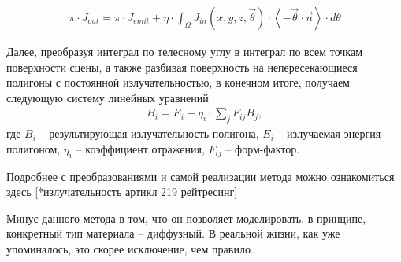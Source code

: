 \begin{gather}  
  \pi \cdot J_{out} = \pi \cdot J_{emit} + \eta \cdot \int_\Omega J_{in}(x,y,z,\vec \theta) \cdot \left\langle  {-\vec \theta \cdot \vec n} \right\rangle \cdot d\theta
\end{gather}

Далее, преобразуя интеграл по телесному углу в интеграл по всем точкам поверхности сцены, а также разбивая поверхность на непересекающиеся полигоны с постоянной излучательностью, в конечном итоге, получаем следующую систему линейных уравнений
\begin{gather}  
  B_i = E_i + \eta_i \cdot \sum_j F_{ij} B_j ,
\end{gather}
где $ B_i $ -- результирующая излучательность полигона, $ E_i $ -- излучаемая энергия полигоном, $ \eta_i $ -- коэффициент отражения, $ F_{ij} $ -- форм-фактор. 

Подробнее с преобразованиями и самой реализации метода можно ознакомиться здесь [*излучательность артикл 219 рейтресинг]

Минус данного метода в том, что он позволяет моделировать, в принципе, конкретный тип материала -- диффузный. В реальной жизни, как уже упоминалось, это скорее исключение, чем правило.

